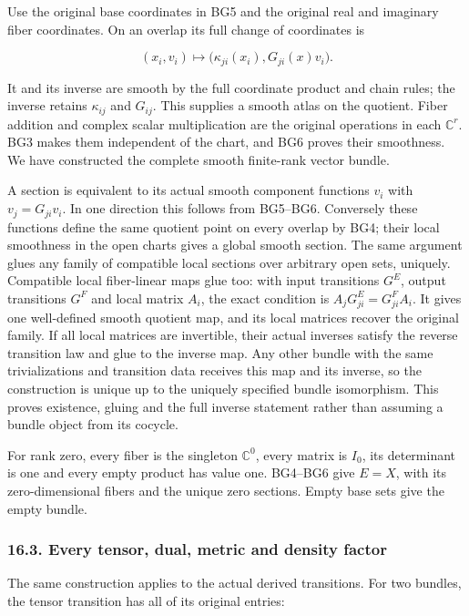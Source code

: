 \documentclass[
  11pt,
]{article}
\begin{document}
Use the original base coordinates in BG5 and the original real and
imaginary fiber coordinates. On an overlap its full change of
coordinates is

\[
 (x_i,v_i)\longmapsto
       \bigl(\kappa_{ji}(x_i),G_{ji}(x)v_i\bigr).
 \tag{BG6}
\]

It and its inverse are smooth by the full coordinate product and chain
rules; the inverse retains \(\kappa_{ij}\) and \(G_{ij}\). This supplies
a smooth atlas on the quotient. Fiber addition and complex scalar
multiplication are the original operations in each \(\mathbb C^r\). BG3
makes them independent of the chart, and BG6 proves their smoothness. We
have constructed the complete smooth finite-rank vector bundle.

A section is equivalent to its actual smooth component functions \(v_i\)
with \(v_j=G_{ji}v_i\). In one direction this follows from BG5--BG6.
Conversely these functions define the same quotient point on every
overlap by BG4; their local smoothness in the open charts gives a global
smooth section. The same argument glues any family of compatible local
sections over arbitrary open sets, uniquely. Compatible local
fiber-linear maps glue too: with input transitions \(G^E\), output
transitions \(G^F\) and local matrix \(A_i\), the exact condition is
\(A_jG^E_{ji}=G^F_{ji}A_i\). It gives one well-defined smooth quotient
map, and its local matrices recover the original family. If all local
matrices are invertible, their actual inverses satisfy the reverse
transition law and glue to the inverse map. Any other bundle with the
same trivializations and transition data receives this map and its
inverse, so the construction is unique up to the uniquely specified
bundle isomorphism. This proves existence, gluing and the full inverse
statement rather than assuming a bundle object from its cocycle.

For rank zero, every fiber is the singleton \(\mathbb C^0\), every
matrix is \(I_0\), its determinant is one and every empty product has
value one. BG4--BG6 give \(E=X\), with its zero-dimensional fibers and
the unique zero sections. Empty base sets give the empty bundle.

\subsubsection{16.3. Every tensor, dual, metric and density
factor}\label{every-tensor-dual-metric-and-density-factor}

The same construction applies to the actual derived transitions. For two
bundles, the tensor transition has all of its original entries:
\end{document}
